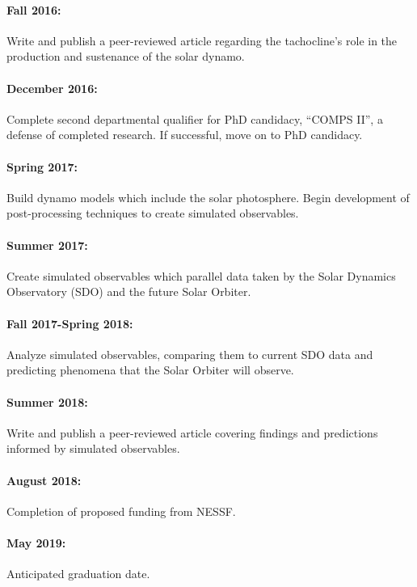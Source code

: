 \documentclass[aasms,12pt]{article}
\begin{document}
\vspace{-0.4cm}
\paragraph{Fall 2016:} Write and publish a peer-reviewed article 
regarding the tachocline's role in the production and sustenance of the solar
dynamo.

\vspace{-0.4cm}
\paragraph{December 2016:} Complete second departmental qualifier for PhD candidacy,
``COMPS II'', a defense of completed research.  If successful, move on to PhD candidacy.

\vspace{-0.4cm}
\paragraph{Spring 2017:} Build dynamo models which include the solar photosphere.
Begin development of post-processing techniques to create simulated observables.

\vspace{-0.4cm}
\paragraph{Summer 2017:} Create simulated observables which parallel data taken
by the Solar Dynamics Observatory (SDO) and the future Solar Orbiter.

\vspace{-0.4cm}
\paragraph{Fall 2017-Spring 2018:} Analyze simulated observables, 
comparing them to current SDO data and predicting phenomena that the Solar Orbiter
will observe.

\vspace{-0.4cm}
\paragraph{Summer 2018:} Write and publish a peer-reviewed article covering
findings and predictions informed by simulated observables.

\vspace{-0.4cm}
\paragraph{August 2018:} Completion of proposed funding from NESSF.

\vspace{-0.4cm}
\paragraph{May 2019:} Anticipated graduation date.
\end{document}
